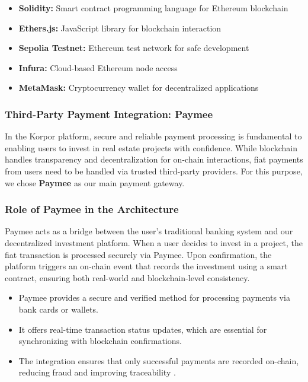 \begin{itemize}
    \item \textbf{Solidity:} Smart contract programming language for Ethereum blockchain
    \item \textbf{Ethers.js:} JavaScript library for blockchain interaction
    \item \textbf{Sepolia Testnet:} Ethereum test network for safe development
    \item \textbf{Infura:} Cloud-based Ethereum node access
    \item \textbf{MetaMask:} Cryptocurrency wallet for decentralized applications
\end{itemize}

\subsubsection{Third-Party Payment Integration: Paymee}

In the Korpor platform, secure and reliable payment processing is fundamental to enabling users to invest in real estate projects with confidence. While blockchain handles transparency and decentralization for on-chain interactions, fiat payments from users need to be handled via trusted third-party providers. For this purpose, we chose \textbf{Paymee} as our main payment gateway.


\subsubsection{Role of Paymee in the Architecture}

Paymee acts as a bridge between the user's traditional banking system and our decentralized investment platform. When a user decides to invest in a project, the fiat transaction is processed securely via Paymee. Upon confirmation, the platform triggers an on-chain event that records the investment using a smart contract, ensuring both real-world and blockchain-level consistency.

\begin{itemize}
    \item Paymee provides a secure and verified method for processing payments via bank cards or wallets.
    \item It offers real-time transaction status updates, which are essential for synchronizing with blockchain confirmations.
    \item The integration ensures that only successful payments are recorded on-chain, reducing fraud and improving traceability \cite{Bamakan2020BlockchainPayment}.
\end{itemize}

